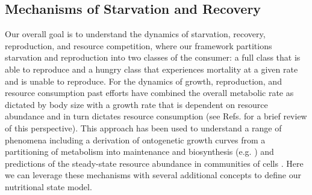 \documentclass{pnastwo}
\begin{document}
\begin{article}

\section*{Mechanisms of Starvation and Recovery}
Our overall goal is to understand the dynamics of starvation, recovery, reproduction, and resource competition, where our framework partitions starvation and reproduction into two classes of the consumer: a full class that is able to reproduce and a hungry class that experiences mortality at a given rate and is unable to reproduce. For the dynamics of growth, reproduction, and resource consumption past efforts have combined the overall metabolic rate as dictated by body size with a growth rate that is dependent on resource abundance and in turn dictates resource consumption (see Refs. \cite{Kempes:2012hy,kempes2014morphological} for a brief review of this perspective). This approach has been used to understand a range of phenomena including a derivation of ontogenetic growth curves from a partitioning of metabolism into maintenance and biosynthesis (e.g. \cite{West:2001bv,moses2008rmo,hou,Kempes:2012hy}) and predictions of the steady-state resource abundance in communities of cells \cite{kempes2014morphological}. Here we can leverage these mechanisms with several additional concepts to define our nutritional state model.


\end{article}
\end{document}
